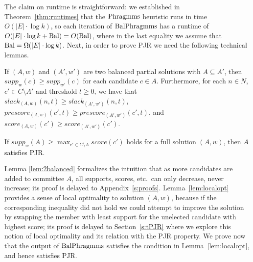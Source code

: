 The claim on runtime is straightforward: we established in Theorem~\ref{thm:runtimes} that the $\operatorname{Phragmms}$ heuristic runs in time $O(|E|\cdot \log k)$, so each iteration of $\operatorname{BalPhragmms}$ has a runtime of $O(|E|\cdot \log k + \operatorname{Bal})=O(\operatorname{Bal})$, where in the last equality we assume that $\operatorname{Bal}= \Omega(|E|\cdot \log k)$.
Next, in order to prove PJR we need the following technical lemmas.

\begin{lemma}\label{lem:2balanced}
If $(A,w)$ and $(A',w')$ are two balanced partial solutions with $A\subseteq A'$, then $supp_w(c)\geq supp_{w'}(c)$ for each candidate $c\in A$. 
Furthermore, for each $n\in N$, $c'\in C\setminus A'$ and threshold $t\geq 0$, we have that $slack_{(A,w)}(n,t)\geq slack_{(A',w')}(n,t)$, $prescore_{(A,w)}(c',t)\geq prescore_{(A',w')}(c',t)$, and $score_{(A,w)}(c')\geq score_{(A',w')}(c')$.
\end{lemma}

\begin{lemma}\label{lem:localopt}
If $supp_w(A)\geq \max_{c'\in C\setminus A} score(c')$ holds for a full solution $(A,w)$, then $A$ satisfies PJR.
\end{lemma}

Lemma \ref{lem:2balanced} formalizes the intuition that as more candidates are added to committee $A$, all supports, scores, etc.~can only decrease, never increase; its proof is delayed to Appendix~\ref{s:proofs}.
Lemma~\ref{lem:localopt} provides a sense of local optimality to solution $(A,w)$, because if the corresponding inequality did not hold we could attempt to improve the solution by swapping the member with least support for the unelected candidate with highest score; its proof is delayed to Section~\ref{s:tPJR} where we explore this notion of local optimality and its relation with the PJR property. 
We prove now that the output of $\operatorname{BalPhragmms}$ satisfies the condition in Lemma~\ref{lem:localopt}, and hence satisfies PJR.

